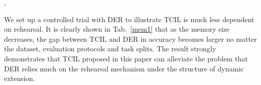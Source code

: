 \documentclass[letterpaper]{article} %
\begin{document}
 \begin{table}
    \centering
\caption{Error statistics on CIFAR100-B0. ITC, ONC, WTC denote inter-task confusion, old-new confusion, within-task confusion, respectively.},
\label{ERROR Analysis}
\end{table}


We set up a controlled trial with DER to illustrate TCIL is much less dependent on rehearsal. It is clearly shown in Tab.~\ref{mem1} that as the memory size decreases, the gap between TCIL and DER in accuracy becomes larger no matter the dataset, evaluation protocols and task splits. The result strongly demonstrates that TCIL proposed in this paper can alleviate the problem that DER relies much on the rehearsal mechanism under the structure of dynamic extension.
\end{document}
